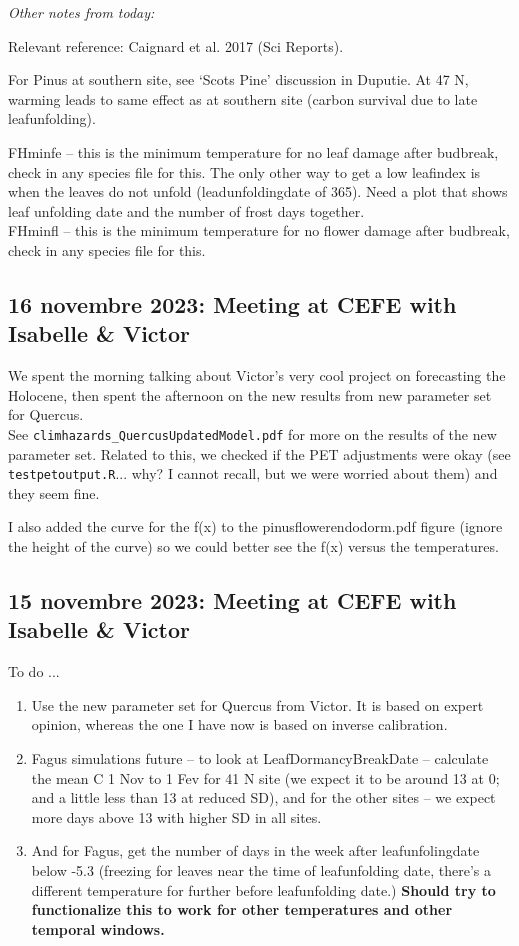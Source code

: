 \documentclass[11pt,letter]{article}
\begin{document}
\emph{Other notes from today:}

Relevant reference: Caignard et al. 2017 (Sci Reports).

For Pinus at southern site, see `Scots Pine' discussion in Duputie. At 47 N, warming leads to same effect as at southern site (carbon survival due to late leafunfolding).

FHminfe -- this is the minimum temperature for no leaf damage after budbreak, check in any species file for this. The only other way to get a low leafindex is when the leaves do not unfold (leadunfoldingdate of 365). Need a plot that shows leaf unfolding date and the number of frost days together. \\
FHminfl -- this is the minimum temperature for no flower damage after budbreak, check in any species file for this.\\


\subsection{16 novembre 2023: Meeting at CEFE with Isabelle \& Victor}

We spent the morning talking about Victor's very cool project on forecasting the Holocene, then spent the afternoon on the new results from new parameter set for Quercus. \\

See \verb|climhazards_QuercusUpdatedModel.pdf| for more on the results of the new parameter set. Related to this, we checked if the PET adjustments were okay (see \verb|testpetoutput.R|... why? I cannot recall, but we were worried about them) and they seem fine. 

I also added the curve for the f(x) to the pinusflowerendodorm.pdf figure (ignore the height of the curve) so we could better see the f(x) versus the temperatures. 


\subsection{15 novembre 2023: Meeting at CEFE with Isabelle \& Victor}

To do ...
\begin{enumerate}
\item Use the new parameter set for Quercus from Victor. It is based on expert opinion, whereas the one I have now is based on inverse calibration. 
\item Fagus simulations future -- to look at LeafDormancyBreakDate -- calculate the mean C 1 Nov to 1 Fev for 41 N site (we expect it to be around 13 at 0; and a little less than 13 at reduced SD), and for the other sites -- we expect more days above 13 with higher SD in all sites. 
\item And for Fagus, get the number of days in the week after leafunfolingdate below -5.3  (freezing for leaves near the time of leafunfolding date, there's a different temperature for further before leafunfolding date.) {\bf Should try to functionalize this to work for other temperatures and other temporal windows.} %
\end{enumerate}
\end{document}
